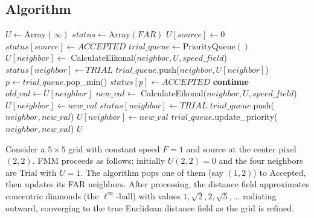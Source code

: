 

\subsection{Algorithm}
\begin{algorithm}
\caption{Fast Marching Method\label{alg:fast_marching}}
\begin{algorithmic}[1]
  \State $U \gets \text{Array}(\infty)$
  \State $status \gets \text{Array}(FAR)$
  \State $U[source] \gets 0$
  \State $status[source] \gets ACCEPTED$
  \State $trial\_queue \gets \text{PriorityQueue}()$
    \State $U[neighbor] \gets$ CalculateEikonal($neighbor, U, speed\_field$)
    \State $status[neighbor] \gets TRIAL$
    \State $trial\_queue$.push($neighbor, U[neighbor]$)
  \EndFor
    \State $p \gets trial\_queue$.pop\_min()
    \State $status[p] \gets ACCEPTED$
       \textbf{continue}
      \EndIf
      \State $old\_val \gets U[neighbor]$
      \State $new\_val \gets$ CalculateEikonal($neighbor, U, speed\_field$)
        \State $U[neighbor] \gets new\_val$
        \State $status[neighbor] \gets TRIAL$
        \State $trial\_queue$.push($neighbor, new\_val$)
        \State $U[neighbor] \gets new\_val$
        \State $trial\_queue$.update\_priority($neighbor, new\_val$)
      \EndIf
    \EndFor
  \EndWhile
  \State \Return $U$
\EndFunction
\end{algorithmic}
\end{algorithm}

\begin{example}\label{example:fmm_uniform}
Consider a $5 \times 5$ grid with constant speed $F = 1$ and source at the center pixel $(2,2)$. FMM proceeds as follows: initially $U(2,2) = 0$ and the four neighbors are Trial with $U = 1$. The algorithm pops one of them (say $(1,2)$) to Accepted, then updates its FAR neighbors. After processing, the distance field approximates concentric diamonds (the $\ell^\infty$-ball) with values $1, \sqrt{2}, 2, \sqrt{5}, \ldots$ radiating outward, converging to the true Euclidean distance field as the grid is refined.
\end{example}

